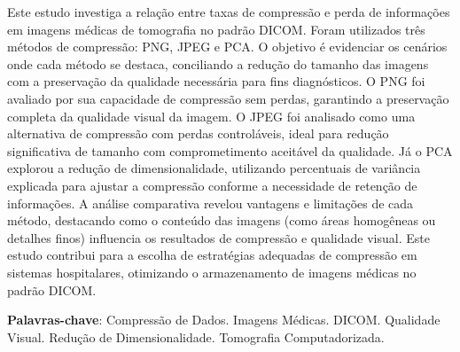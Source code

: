 Este estudo investiga a relação entre taxas de compressão e perda de informações em imagens médicas de tomografia no padrão \acrshort{DICOM}. Foram utilizados três métodos de compressão: \acrshort{PNG}, \acrshort{JPEG} e \acrshort{PCA}. O objetivo é evidenciar os cenários onde cada método se destaca, conciliando a redução do tamanho das imagens com a preservação da qualidade necessária para fins diagnósticos. O \acrshort{PNG} foi avaliado por sua capacidade de compressão sem perdas, garantindo a preservação completa da qualidade visual da imagem. O \acrshort{JPEG} foi analisado como uma alternativa de compressão com perdas controláveis, ideal para redução significativa de tamanho com comprometimento aceitável da qualidade. Já o \acrshort{PCA} explorou a redução de dimensionalidade, utilizando percentuais de variância explicada para ajustar a compressão conforme a necessidade de retenção de informações. A análise comparativa revelou vantagens e limitações de cada método, destacando como o conteúdo das imagens (como áreas homogêneas ou detalhes finos) influencia os resultados de compressão e qualidade visual. Este estudo contribui para a escolha de estratégias adequadas de compressão em sistemas hospitalares, otimizando o armazenamento de imagens médicas no padrão \acrshort{DICOM}.

\textbf{Palavras-chave}: Compressão de Dados. Imagens Médicas. \acrshort{DICOM}. Qualidade Visual. Redução de Dimensionalidade. Tomografia Computadorizada.
